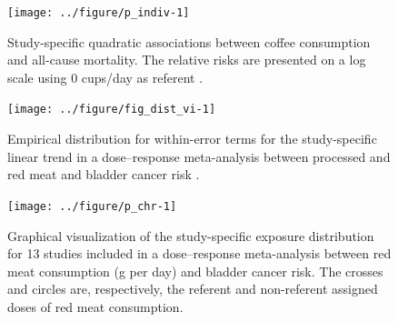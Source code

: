 \documentclass[11pt,a4paper,twoside,openany]{book}\usepackage{knitr}
\begin{document}
{{\begin{knitrout}
\begin{figure}[ht!]
{\centering \texttt{[image: ../figure/p\_indiv-1]} 

}

\caption[Study-specific quadratic associations between coffee consumption and all-cause mortality]{Study-specific quadratic associations between coffee consumption and all-cause mortality. The relative risks are presented on a log scale using 0 cups/day as referent \citep{crippa2016red}.}\label{fig:p_indiv}
\end{figure}


\end{knitrout}

\begin{knitrout}\footnotesize
{}\color{fgcolor}\begin{figure}[ht!]

{\centering \texttt{[image: ../figure/fig\_dist\_vi-1]} 

}

\caption[Empirical distribution for within-error terms for the study-specific linear trend in a dose--response meta-analysis between processed and red meat and bladder cancer risk \citep{crippa2016red}]{Empirical distribution for within-error terms for the study-specific linear trend in a dose--response meta-analysis between processed and red meat and bladder cancer risk \citep{crippa2016red}.}\label{fig:fig_dist_vi}
\end{figure}


\end{knitrout}

\begin{knitrout}\footnotesize
{}\color{fgcolor}\begin{figure}[ht!]

{\centering \texttt{[image: ../figure/p\_chr-1]} 

}

\caption[Graphical visualization of the study-specific exposure distribution for 13 studies included in a dose--response meta-analysis between red meat consumption (g per day) and bladder cancer risk]{Graphical visualization of the study-specific exposure distribution for 13 studies included in a dose--response meta-analysis between red meat consumption (g per day) and bladder cancer risk. The crosses and circles are, respectively, the referent and non-referent assigned doses of red meat consumption.}\label{fig:p_chr}
\end{figure}


\end{knitrout}

}}
\end{document}
